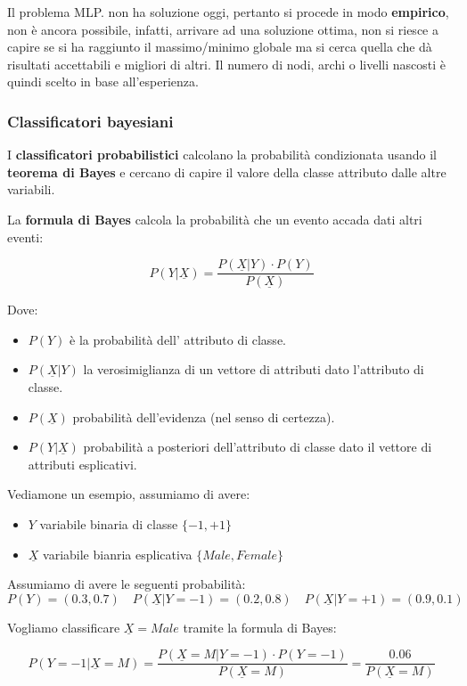 Il problema MLP. non ha soluzione oggi, pertanto si procede in modo \textbf{empirico}, non è ancora possibile, infatti, arrivare ad una soluzione ottima, non si riesce a capire se si ha raggiunto il massimo/minimo globale ma si cerca quella che dà risultati accettabili e migliori di altri. Il numero di nodi, archi o livelli nascosti è quindi scelto in base all'esperienza.


\subsubsection{Classificatori bayesiani}
I \textbf{classificatori probabilistici} calcolano la probabilità condizionata usando il \textbf{teorema di Bayes} e cercano di capire il valore della classe attributo dalle altre variabili. 

\begin{defn}

La \textbf{formula di Bayes} calcola la probabilità che un evento accada dati altri eventi: 

\[P(Y|\underline{X}) = \frac{P(\underline{X}|Y) \cdot P(Y)}{P(\underline{X})}\]

Dove:
\begin{itemize}
	\item $P(Y)$ è la probabilità dell' attributo di classe.
	\item $P(\underline{X}|Y)$ la verosimiglianza di un vettore di attributi dato l'attributo di classe.
	\item $P(\underline{X})$ probabilità dell'evidenza (nel senso di certezza).
	\item $P(Y|\underline{X})$ probabilità a  posteriori dell'attributo di classe  dato il vettore di attributi esplicativi.
\end{itemize}

Vediamone un esempio, assumiamo di avere:
\begin{itemize}
	\item $Y$ variabile binaria di classe $\{-1,+1\}$
	\item $\underline{X}$ variabile bianria esplicativa $\{Male, Female\}$
\end{itemize}
\end{defn}
Assumiamo di avere le seguenti probabilità: 
\[P(Y) = (0.3,0.7) \quad P(\underline{X}|Y=-1) = (0.2,0.8) \quad P(\underline{X}|Y = +1) = (0.9,0.1)\]

Vogliamo classificare $\underline{X} = Male$ tramite la formula di Bayes:

\[P(Y = -1 | \underline{X} = M) = \frac{P(\underline{X} = M | Y=-1) \cdot P(Y=-1)}{P(\underline{X}= M)} = \frac{0.06}{P(\underline{X} = M)}\]

